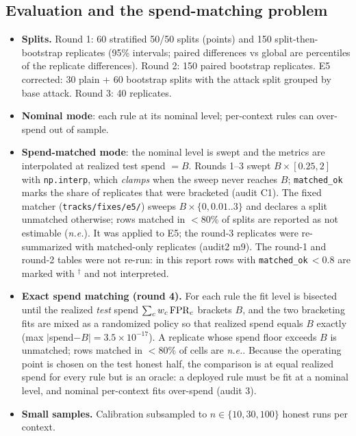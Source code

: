 \documentclass[11pt]{article}
\newcommand{\NE}{\textit{n.e.}}
\begin{document}
\subsection{Evaluation and the spend-matching problem}
\begin{itemize}
\item \textbf{Splits.} Round 1: 60 stratified 50/50 splits (points) and 150 split-then-bootstrap replicates (95\% intervals; paired differences vs global are percentiles of the replicate differences). Round 2: 150 paired bootstrap replicates. E5 corrected: 30 plain + 60 bootstrap splits with the attack split grouped by base attack. Round 3: 40 replicates.
\item \textbf{Nominal mode}: each rule at its nominal level; per-context rules can over-spend out of sample.
\item \textbf{Spend-matched mode}: the nominal level is swept and the metrics are interpolated at realized test spend $=B$. Rounds 1--3 swept $B\times[0.25,2]$ with \texttt{np.interp}, which \emph{clamps} when the sweep never reaches $B$; \texttt{matched\_ok} marks the share of replicates that were bracketed (audit C1). The fixed matcher (\texttt{tracks/fixes/e5/}) sweeps $B\times\{0,0.01..3\}$ and declares a split unmatched otherwise; rows matched in $<80\%$ of splits are reported as not estimable (\NE). It was applied to E5; the round-3 replicates were re-summarized with matched-only replicates (audit2 m9). The round-1 and round-2 tables were not re-run: in this report rows with \texttt{matched\_ok}$\,<0.8$ are marked with $^\dagger$ and not interpreted.
\item \textbf{Exact spend matching (round 4).} For each rule the fit level is bisected until the realized \emph{test} spend $\sum_c w_c\,\mathrm{FPR}_c$ brackets $B$, and the two bracketing fits are mixed as a randomized policy so that realized spend equals $B$ exactly (max $|$spend$-B|=3.5\times10^{-17}$). A replicate whose spend floor exceeds $B$ is unmatched; rows matched in $<80\%$ of cells are \NE. Because the operating point is chosen on the test honest half, the comparison is at equal realized spend for every rule but is an oracle: a deployed rule must be fit at a nominal level, and nominal per-context fits over-spend (audit 3).
\item \textbf{Small samples.} Calibration subsampled to $n\in\{10,30,100\}$ honest runs per context.
\end{itemize}
\end{document}
